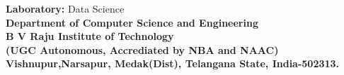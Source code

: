 \begin{titlepage}
\begin{center}
		\vspace{8pt}
		
		{\bf Laboratory:} Data Science\\
		\textbf{\Large{Department of Computer Science and Engineering}\\
			\Large{B V Raju Institute of Technology}\\
   \vspace{4pt}  
             \small{(UGC Autonomous, Accrediated by NBA and NAAC)\\
             Vishnupur,Narsapur, Medak(Dist), Telangana State, India-502313.}\\
}
	\end{center}

\end{titlepage}
